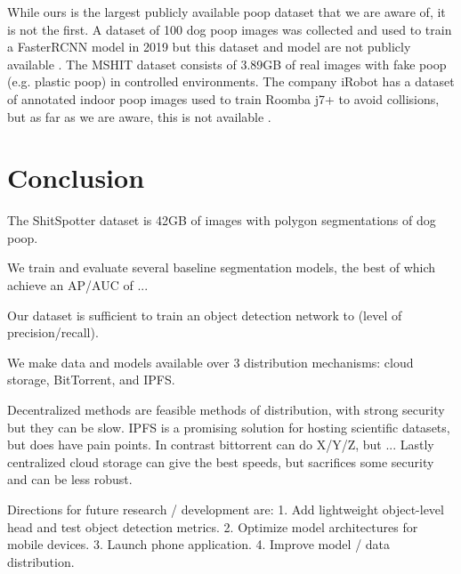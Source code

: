 \documentclass[10pt,twocolumn,letterpaper]{article}
\begin{document}
While ours is the largest publicly available poop dataset that we are aware of,
it is not the first.
A dataset of 100 dog poop images was collected and used to train a FasterRCNN
model in 2019 but this dataset and model are not publicly available \cite{neeraj_madan_dog_2019}.
The MSHIT dataset \cite{mshit_2020} consists of 3.89GB of real images with fake
poop (e.g. plastic poop) in controlled environments.
The company iRobot has a dataset of annotated indoor poop images used to train
Roomba j7+ to avoid collisions, but as far as we are aware, this is not
available \cite{roomba_2021}.

\section{Conclusion}

The ShitSpotter dataset is 42GB of images with polygon segmentations of dog
poop. 

We train and evaluate several baseline segmentation models, the best of which 
achieve an AP/AUC of ...

Our dataset is sufficient to train an object detection network to (level of
precision/recall).

We make data and models available over 3 distribution mechanisms: 
cloud storage, BitTorrent, and IPFS.

Decentralized methods are feasible methods of distribution, with strong
security but they can be slow.
IPFS is a promising solution for hosting scientific datasets, but does have pain points.
In contrast bittorrent can do X/Y/Z, but ...
Lastly centralized cloud storage can give the best speeds, but sacrifices some
security and can be less robust.

Directions for future research / development are:
1. Add lightweight object-level head and test object detection metrics.
2. Optimize model architectures for mobile devices.
3. Launch phone application.
4. Improve model / data distribution.


{\small


}
%
\end{document}
